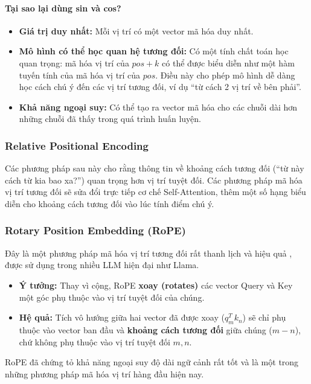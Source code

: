 \paragraph{Tại sao lại dùng sin và cos?}
\begin{itemize}
    \item \textbf{Giá trị duy nhất:} Mỗi vị trí có một vector mã hóa duy nhất.
    \item \textbf{Mô hình có thể học quan hệ tương đối:} Có một tính chất toán học quan trọng: mã hóa vị trí của $pos+k$ có thể được biểu diễn như một hàm tuyến tính của mã hóa vị trí của $pos$. Điều này cho phép mô hình dễ dàng học cách chú ý đến các vị trí tương đối, ví dụ “từ cách 2 vị trí về bên phải”.
    \item \textbf{Khả năng ngoại suy:} Có thể tạo ra vector mã hóa cho các chuỗi dài hơn những chuỗi đã thấy trong quá trình huấn luyện.
\end{itemize}

\subsubsection{Relative Positional Encoding}
Các phương pháp sau này cho rằng thông tin về khoảng cách tương đối (“từ này cách từ kia bao xa?”) quan trọng hơn vị trí tuyệt đối. Các phương pháp mã hóa vị trí tương đối sẽ sửa đổi trực tiếp cơ chế Self-Attention, thêm một số hạng biểu diễn cho khoảng cách tương đối vào lúc tính điểm chú ý.

\subsubsection{Rotary Position Embedding (RoPE)}
Đây là một phương pháp mã hóa vị trí tương đối rất thanh lịch và hiệu quả \cite{su2021roformer}, được sử dụng trong nhiều LLM hiện đại như Llama.
\begin{itemize}
    \item \textbf{Ý tưởng:} Thay vì cộng, RoPE \textbf{xoay (rotates)} các vector Query và Key một góc phụ thuộc vào vị trí tuyệt đối của chúng.
    \item \textbf{Hệ quả:} Tích vô hướng giữa hai vector đã được xoay ($q_m^T k_n$) sẽ chỉ phụ thuộc vào vector ban đầu và \textbf{khoảng cách tương đối} giữa chúng ($m-n$), chứ không phụ thuộc vào vị trí tuyệt đối $m, n$.
\end{itemize}
RoPE đã chứng tỏ khả năng ngoại suy độ dài ngữ cảnh rất tốt và là một trong những phương pháp mã hóa vị trí hàng đầu hiện nay.